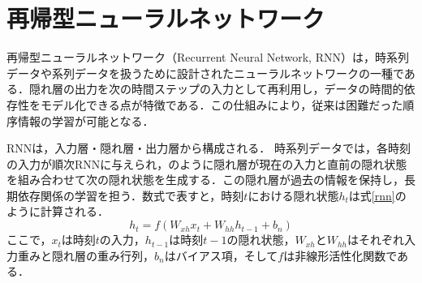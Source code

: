 
\section{再帰型ニューラルネットワーク}
再帰型ニューラルネットワーク（Recurrent Neural Network, RNN）\cite{rumelhart1986learning1,rumelhart1986learning2}は，時系列データや系列データを扱うために設計されたニューラルネットワークの一種である．隠れ層の出力を次の時間ステップの入力として再利用し，データの時間的依存性をモデル化できる点が特徴である．この仕組みにより，従来は困難だった順序情報の学習が可能となる．

RNNは，入力層・隠れ層・出力層から構成される．
時系列データでは，各時刻の入力が順次RNNに与えられ，のように隠れ層が現在の入力と直前の隠れ状態を組み合わせて次の隠れ状態を生成する．この隠れ層が過去の情報を保持し，長期依存関係の学習を担う．数式で表すと，時刻$t$における隠れ状態$h_t$は式\eqref{rnn}のように計算される．
\begin{equation}
h_t = f(W_{xh}x_t + W_{hh}h_{t-1} + b_n)\label{rnn}
\end{equation}
ここで，$x_t$は時刻$t$の入力，$h_{t-1}$は時刻$t-1$の隠れ状態，$W_{xh}$と$W_{hh}$はそれぞれ入力重みと隠れ層の重み行列，$b_n$はバイアス項，そして$f$は非線形活性化関数である．

